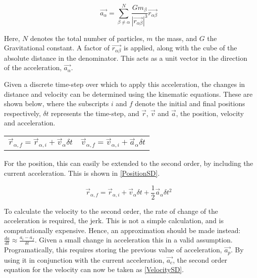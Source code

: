 \documentclass[a4paper,10pt]{article}
\begin{document}
\begin{equation} \label{Sum_a}
    \vec{a_\alpha} =  \sum\limits_{\beta\neq \alpha}^{N} \frac{G m_\beta}{\left|\vec{r_{\alpha\beta}}\right|^3}\vec{r_{\alpha\beta}}
\end{equation}

Here, $N$ denotes the total number of particles, $m$ the mass, and $G$ the Gravitational constant. A factor of $\vec{r_{\alpha\beta}}$ is applied, along with the cube of the absolute distance in the denominator. This acts as a unit vector in the direction of the acceleration, $ \vec{a_\alpha}$.\newline  


Given a discrete time-step over which to apply this acceleration, the changes in distance and velocity can be determined using the kinematic equations. These are shown below, where the subscripts $i$ and $f$ denote the initial and final positions respectively, $\delta t$ represents the time-step, and $\vec r$, $\vec v$ and $\vec a$, the position, velocity and acceleration. %

\noindent\begin{tabularx}{\textwidth}{@{}XX@{}}
  \begin{equation*}
   \vec{r}_{\alpha,f} =  \vec{r}_{\alpha,i} + \vec{v}_{\alpha} \delta t
    \label{PositionFD}
  \end{equation*} &
  \begin{equation*}
 \vec{v}_{\alpha,f} =  \vec{v}_{\alpha,i} + \vec{a}_{\alpha} \delta t
    \label{VelocityFD}
  \end{equation*}
\end{tabularx}

For the position, this can easily be extended to the second order, by including the current acceleration. This is shown in \cref{PositionSD}.

\begin{equation} \label{PositionSD}
    \vec{r}_{\alpha,f} =  \vec{r}_{\alpha,i} + \vec{v}_{\alpha} \delta t + \frac{1}{2}\vec{a}_{\alpha}\delta t^2
\end{equation}

To calculate the velocity to the second order, the rate of change of the acceleration is required, the jerk. This is not a simple calculation, and is computationally expensive. Hence, an approximation should be made instead: $\frac{da}{dt} \approx \frac{a_i - a_f}{\delta t}$. Given a small change in acceleration this in a valid assumption. Programatically, this requires storing the previous value of acceleration, $\vec{a_p}$. By using it in conjunction with the current acceleration, $\vec{a_c}$, the second order equation for the velocity can now be taken as \cref{VelocitySD}.
\end{document}
